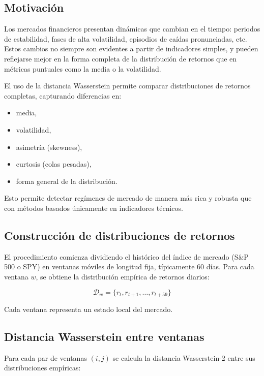 \documentclass[12pt]{article}
\begin{document}
\subsection{Motivación}

Los mercados financieros presentan dinámicas que cambian en el tiempo: periodos de estabilidad, fases de alta volatilidad, episodios de caídas pronunciadas, etc. Estos cambios no siempre son evidentes a partir de indicadores simples, y pueden reflejarse mejor en la forma completa de la distribución de retornos que en métricas puntuales como la media o la volatilidad.

El uso de la distancia Wasserstein permite comparar distribuciones de retornos completas, capturando diferencias en:

\begin{itemize}
    \item media,
    \item volatilidad,
    \item asimetría (skewness),
    \item curtosis (colas pesadas),
    \item forma general de la distribución.
\end{itemize}

Esto permite detectar regímenes de mercado de manera más rica y robusta que con métodos basados únicamente en indicadores técnicos.

\subsection{Construcción de distribuciones de retornos}

El procedimiento comienza dividiendo el histórico del índice de mercado (S\&P 500 o SPY) en ventanas móviles de longitud fija, típicamente 60 días. Para cada ventana $w$, se obtiene la distribución empírica de retornos diarios:



\[
\mathcal{D}_w = \{ r_{t}, r_{t+1}, \dots, r_{t+59} \}
\]



Cada ventana representa un estado local del mercado.

\subsection{Distancia Wasserstein entre ventanas}

Para cada par de ventanas $(i, j)$ se calcula la distancia Wasserstein-2 entre sus distribuciones empíricas:
\end{document}
